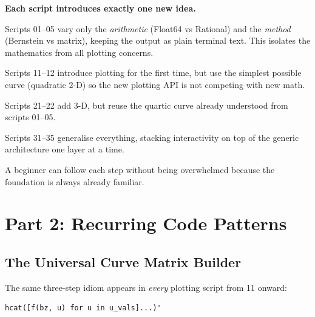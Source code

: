 \documentclass[12pt, a4paper]{article}
\newcommand{\cd}[1]{\texttt{#1}}
\begin{document}
\begin{insightbox}
\textbf{Each script introduces exactly one new idea.}

Scripts 01--05 vary only the \emph{arithmetic} (Float64
vs Rational) and the \emph{method} (Bernstein vs matrix),
keeping the output as plain terminal text.
This isolates the mathematics from all plotting concerns.

Scripts 11--12 introduce plotting for the first time,
but use the simplest possible curve (quadratic 2-D)
so the new plotting API is not competing with new math.

Scripts 21--22 add 3-D, but reuse the quartic curve
already understood from scripts 01--05.

Scripts 31--35 generalise everything, stacking interactivity
on top of the generic architecture one layer at a time.

A beginner can follow each step without being overwhelmed
because the foundation is always already familiar.
\end{insightbox}


\section{Part 2: Recurring Code Patterns}

\subsection{The Universal Curve Matrix Builder}

The same three-step idiom appears in \emph{every} plotting
script from 11 onward:

\begin{verbatim}
hcat([f(bz, u) for u in u_vals]...)'
\end{verbatim}

\begin{center}
\end{center}
\end{document}
